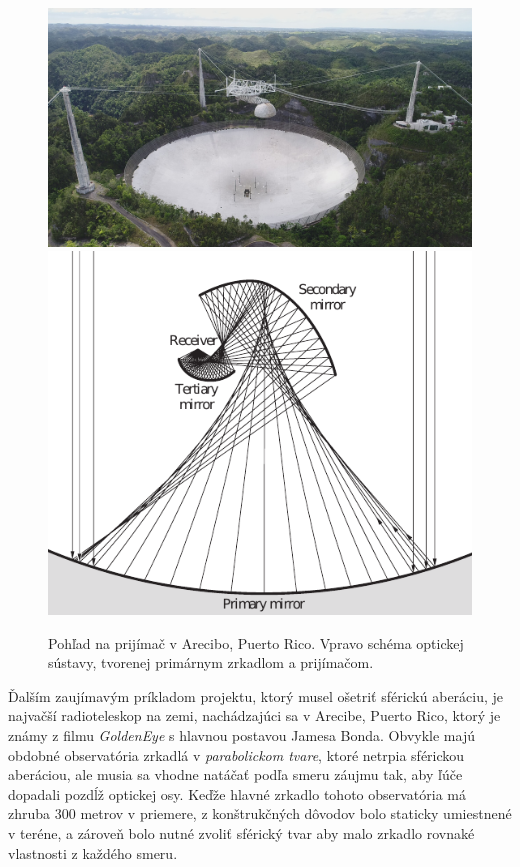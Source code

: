 \begin{figure}
    \includegraphics[scale=0.12]{obrazky-figures/areciboSite.jpg}
    \includegraphics[scale=0.65]{obrazky-figures/arecibo.pdf}
    \caption{Pohľad na prijímač v Arecibo, Puerto Rico. Vpravo schéma optickej sústavy, tvorenej
    primárnym zrkadlom a prijímačom.}
\end{figure}


Ďalším zaujímavým príkladom projektu, ktorý musel ošetriť sférickú aberáciu, je najvačší
radioteleskop na zemi, nachádzajúci sa v Arecibe, Puerto Rico, ktorý je známy z filmu
\textit{GoldenEye} s hlavnou postavou Jamesa Bonda. 
Obvykle majú obdobné observatória zrkadlá v \textit{parabolickom tvare}, ktoré netrpia sférickou
aberáciou, ale musia sa vhodne natáčať podľa smeru záujmu tak, aby ľúče dopadali pozdĺž optickej osy. Keďže hlavné zrkadlo tohoto observatória má
zhruba 300 metrov v priemere, z konštrukčných dôvodov bolo staticky umiestnené v
teréne, a zároveň bolo nutné zvoliť sférický tvar aby malo zrkadlo rovnaké vlastnosti z každého smeru.

